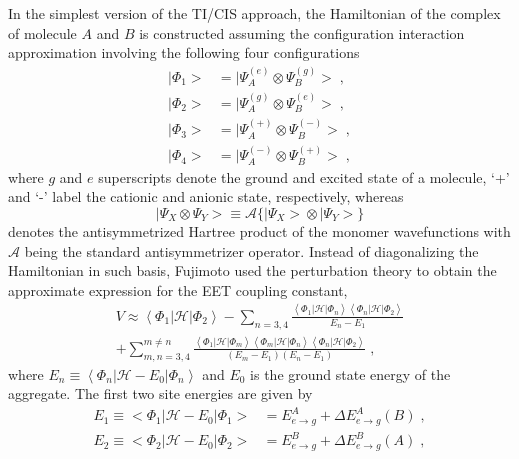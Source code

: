 In the simplest version of the TI/CIS approach, the Hamiltonian of the 
complex of molecule $A$ and $B$ is constructed assuming the configuration interaction
approximation involving the following four configurations
%
\begin{subequations}
\begin{align}
 \big| \Phi_1 \big> &= \big| \Psi_A^{(e)} \otimes \Psi_B^{(g)} \big> \;, \\
 \big| \Phi_2 \big> &= \big| \Psi_A^{(g)} \otimes \Psi_B^{(e)} \big> \;, \\
 \big| \Phi_3 \big> &= \big| \Psi_A^{(+)} \otimes \Psi_B^{(-)} \big> \;, \\
 \big| \Phi_4 \big> &= \big| \Psi_A^{(-)} \otimes \Psi_B^{(+)} \big> \;,
\end{align}
\end{subequations}
%
where $g$ and $e$ superscripts denote the ground and excited state of a molecule,
`+' and `-' label the cationic and anionic state, respectively, 
whereas
%
\begin{equation}
\big| \Psi_X \otimes \Psi_Y \big> \equiv \mathscr{A} \Big\{ \big| \Psi_X \big> \otimes \big| \Psi_Y \big> \Big\}
\end{equation}
%
denotes the antisymmetrized Hartree product
of the monomer wavefunctions with $\mathscr{A}$ being the standard antisymmetrizer operator. 
Instead of diagonalizing the Hamiltonian in such basis,
Fujimoto used the perturbation theory to obtain the approximate expression for the EET coupling
constant,
%
\begin{multline}
  V \approx \left< \Phi_1 \vert \mathscr{H} \vert \Phi_2 \right> 
   - \sum_{n=3,4} \frac{\left< \Phi_1 \vert \mathscr{H} \vert \Phi_n \right> 
                        \left< \Phi_n \vert \mathscr{H} \vert \Phi_2 \right>}{E_n - E_1} \\
   + \sum_{m,n=3,4}^{m\ne n}
     \frac{\left< \Phi_1 \vert \mathscr{H} \vert \Phi_m \right>
           \left< \Phi_m \vert \mathscr{H} \vert \Phi_n \right>
           \left< \Phi_n \vert \mathscr{H} \vert \Phi_2 \right>}{(E_m-E_1)(E_n-E_1)} \;,
\end{multline}
%
where $E_n \equiv \left< \Phi_n \vert \mathscr{H} -E_{0} \vert \Phi_n \right>$
and $E_0$ is the ground state energy of the aggregate.
The first two site energies are given by
%
\begin{subequations}
\begin{align}
 E_1 \equiv \big< \Phi_1 \big| \mathscr{H} -E_{0} \big| \Phi_1 \big> &= E^A_{e\rightarrow g} 
  + \Delta E^A_{e\rightarrow g}(B) \;, \\
 E_2 \equiv \big< \Phi_2 \big| \mathscr{H} -E_{0} \big| \Phi_2 \big> &= E^B_{e\rightarrow g} 
  + \Delta E^B_{e\rightarrow g}(A) \;,
\end{align}
\end{subequations}
